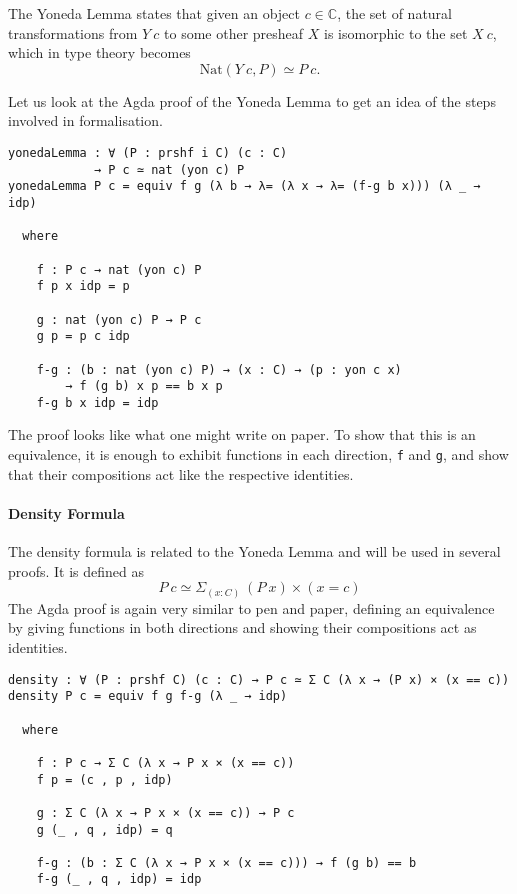 \documentclass[12pt, parskip, DIV=14]{scrbook}
\begin{document}
The Yoneda Lemma states that given an object $c \in \mathbb{C}$, the set of natural transformations from $Y~c$ to some other presheaf $X$ is isomorphic to the set $X~c$, which in type theory becomes $$\mathrm{Nat}(Y~c , P) \simeq P~c.$$

Let us look at the Agda proof of the Yoneda Lemma to get an idea of the steps involved in formalisation.

{\small
\begin{verbatim}
yonedaLemma : ∀ (P : prshf i C) (c : C)
            → P c ≃ nat (yon c) P
yonedaLemma P c = equiv f g (λ b → λ= (λ x → λ= (f-g b x))) (λ _ → idp)

  where

    f : P c → nat (yon c) P
    f p x idp = p

    g : nat (yon c) P → P c
    g p = p c idp

    f-g : (b : nat (yon c) P) → (x : C) → (p : yon c x)
        → f (g b) x p == b x p
    f-g b x idp = idp
\end{verbatim}}

The proof looks like what one might write on paper. To show that this is an equivalence, it is enough to exhibit functions in each direction, \texttt{f} and \texttt{g}, and show that their compositions act like the respective identities.

\paragraph{Density Formula}

The density formula is related to the Yoneda Lemma and will be used in several proofs. It is defined as
$$P~c \simeq \Sigma_{(x : C)}~(P~x) \times (x = c)$$
The Agda proof is again very similar to pen and paper, defining an equivalence by giving functions in both directions and showing their compositions act as identities.

{\small
\begin{verbatim}
density : ∀ (P : prshf C) (c : C) → P c ≃ Σ C (λ x → (P x) × (x == c))
density P c = equiv f g f-g (λ _ → idp)

  where

    f : P c → Σ C (λ x → P x × (x == c))
    f p = (c , p , idp)

    g : Σ C (λ x → P x × (x == c)) → P c
    g (_ , q , idp) = q

    f-g : (b : Σ C (λ x → P x × (x == c))) → f (g b) == b
    f-g (_ , q , idp) = idp
\end{verbatim}}
\end{document}

